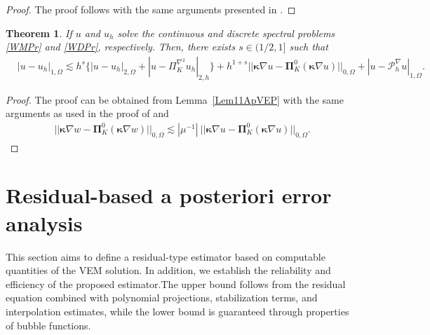 \documentclass[final,reqno]{elsarticle}
\newtheorem{theorem}{Theorem}[section]
\def\bkappa{\boldsymbol{\kappa}}
\def\bPi{\mathbf{\Pi}}
\begin{document}
\begin{proof}
The proof follows with the same arguments presented in \cite[Lemma~11]{dassi2025posteriorierrorestimatesc1}.
\end{proof}

\begin{theorem}\label{ApTeo12VEP}
If $u$ and $u_h$ solve the continuous and discrete spectral problems \eqref{WMPr} and \eqref{WDPr}, respectively. Then, there exists $s\in (1/2,1]$ such that 
\begin{align}
&|u-u_h|_{1,\Omega}\lesssim h^s\Big\{|u-u_h|_{2,\Omega} + |u-\Pi_K^{\nabla^2}u_h|_{2,h} \Big\}  + h^{1+s}||\bkappa \nabla u - \bPi_K^0(\bkappa \nabla u)  ||_{0,\Omega}  + |u-\mathcal{P}_h^{\nabla} u|_{1,\Omega}. \nonumber
\end{align}   
\end{theorem}
\begin{proof}
The proof can be obtained from Lemma~\ref{Lem11ApVEP} with the same arguments as used in the proof of \cite[Theorem~12]{dassi2025posteriorierrorestimatesc1} and 
    \begin{align}
||\bkappa \nabla w - \bPi_K^0(\bkappa \nabla w)  ||_{0,\Omega}\lesssim |\mu^{-1}|\ 
||\bkappa \nabla u - \bPi_K^0(\bkappa \nabla u)  ||_{0,\Omega}.\nonumber
\end{align}
\end{proof}




\setcounter{equation}{0}
\section{Residual-based a posteriori error analysis} \label{sec:apost}
\label{SEC:EST_A_POST}
This section aims to define a residual-type estimator based on computable quantities of the VEM solution. In addition, we establish the reliability and efficiency of the proposed estimator.The upper bound follows from the residual equation combined with polynomial projections, stabilization terms, and interpolation estimates, while the lower bound is guaranteed through properties of bubble functions. %
\end{document}
